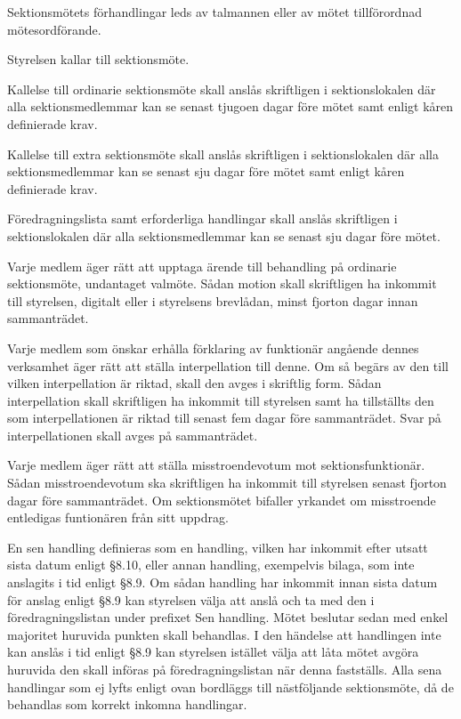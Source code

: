 \documentclass[stadgar]{dsekprotokoll}
\begin{document}
\begin{stadgeavsnitt}

Sektionsmötets förhandlingar leds av talmannen eller av mötet tillförordnad
mötesordförande.


Styrelsen kallar till sektionsmöte.

Kallelse till ordinarie sektionsmöte skall anslås skriftligen i sektionslokalen där alla sektionsmedlemmar kan se senast tjugoen dagar före mötet samt enligt kåren definierade krav.

Kallelse till extra sektionsmöte skall anslås skriftligen i sektionslokalen där alla sektionsmedlemmar kan se senast sju dagar före mötet samt enligt kåren definierade krav.


Föredragningslista samt erforderliga handlingar skall anslås skriftligen i sektionslokalen där alla sektionsmedlemmar kan se senast sju dagar före mötet.


Varje medlem äger rätt att upptaga ärende till behandling på ordinarie sektionsmöte, undantaget valmöte. Sådan motion skall skriftligen ha inkommit till styrelsen, digitalt eller i styrelsens brevlådan, minst fjorton dagar innan sammanträdet.

Varje medlem som önskar erhålla förklaring av funktionär angående dennes verksamhet äger rätt att ställa interpellation till denne. Om så begärs av den till vilken interpellation är riktad, skall den avges i skriftlig form. Sådan interpellation skall skriftligen ha inkommit till styrelsen samt ha tillställts den som interpellationen är riktad till senast fem dagar före sammanträdet. Svar på interpellationen skall avges på sammanträdet.


Varje medlem äger rätt att ställa misstroendevotum mot sektionsfunktionär. Sådan misstroendevotum ska skriftligen ha inkommit till styrelsen senast fjorton dagar före sammanträdet. Om sektionsmötet bifaller yrkandet om misstroende entledigas funtionären från sitt uppdrag.

En sen handling definieras som en handling, vilken har inkommit efter utsatt sista datum enligt
\S8.10, eller annan handling, exempelvis bilaga, som inte anslagits i tid enligt \S8.9. Om sådan
handling har inkommit innan sista datum för anslag enligt \S8.9 kan styrelsen välja att anslå och
ta med den i föredragningslistan under prefixet Sen handling. Mötet beslutar sedan med enkel
majoritet huruvida punkten skall behandlas. I den händelse att handlingen inte kan anslås i
tid enligt \S8.9 kan styrelsen istället välja att låta mötet avgöra huruvida den skall införas på föredragningslistan
när denna fastställs. Alla sena handlingar som ej lyfts enligt ovan bordläggs
till nästföljande sektionsmöte, då de behandlas som korrekt inkomna handlingar.


\end{stadgeavsnitt}
\end{document}
